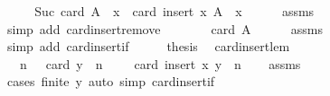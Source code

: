 \begin{isabellebody}
%
\isatagproof
{}\isamarkupfalse%
\ {\isacharminus}{\kern0pt}\isanewline
\ \ \isamarkupfalse%
\ {\isachardoublequoteopen}Suc\ {\isacharparenleft}{\kern0pt}card\ {\isacharparenleft}{\kern0pt}A\ {\isacharminus}{\kern0pt}\ {\isacharbraceleft}{\kern0pt}x{\isacharbraceright}{\kern0pt}{\isacharparenright}{\kern0pt}{\isacharparenright}{\kern0pt}\ {\isacharequal}{\kern0pt}\ card\ {\isacharparenleft}{\kern0pt}insert\ x\ {\isacharparenleft}{\kern0pt}A\ {\isacharminus}{\kern0pt}\ {\isacharbraceleft}{\kern0pt}x{\isacharbraceright}{\kern0pt}{\isacharparenright}{\kern0pt}{\isacharparenright}{\kern0pt}{\isachardoublequoteclose}\isanewline
\ \ \ \ \isamarkupfalse%
\ assms\ \isamarkupfalse%
\ {\isacharparenleft}{\kern0pt}simp\ add{\isacharcolon}{\kern0pt}\ card{\isachardot}{\kern0pt}insert{\isacharunderscore}{\kern0pt}remove{\isacharparenright}{\kern0pt}\isanewline
\ \ \isamarkupfalse%
\ \isamarkupfalse%
\ {\isachardoublequoteopen}{\isachardot}{\kern0pt}{\isachardot}{\kern0pt}{\isachardot}{\kern0pt}\ {\isacharequal}{\kern0pt}\ card\ A{\isachardoublequoteclose}\isanewline
\ \ \ \ \isamarkupfalse%
\ assms\ \isamarkupfalse%
\ {\isacharparenleft}{\kern0pt}simp\ add{\isacharcolon}{\kern0pt}\ card{\isacharunderscore}{\kern0pt}insert{\isacharunderscore}{\kern0pt}if{\isacharparenright}{\kern0pt}\isanewline
\ \ \isamarkupfalse%
\ \isamarkupfalse%
\ {\isacharquery}{\kern0pt}thesis\ \isacommand{{\isachardot}{\kern0pt}}\isamarkupfalse%
\isanewline
{}\isamarkupfalse%
%
\endisatagproof
{\isafoldproof}%
%
\isadelimproof
\isanewline
%
\endisadelimproof
\isanewline
{}\isamarkupfalse%
\ card{\isacharunderscore}{\kern0pt}insert{\isacharunderscore}{\kern0pt}le{\isacharunderscore}{\kern0pt}m{}{\isacharcolon}{\kern0pt}\isanewline
\ \ \ {\isachardoublequoteopen}n\ {\isachargreater}{\kern0pt}\ {}{\isachardoublequoteclose}\ {\isachardoublequoteopen}card\ y\ {\isasymle}\ n\ {\isacharminus}{\kern0pt}\ {}{\isachardoublequoteclose}\ \ \ {\isachardoublequoteopen}card\ {\isacharparenleft}{\kern0pt}insert\ x\ y{\isacharparenright}{\kern0pt}\ {\isasymle}\ n{\isachardoublequoteclose}\isanewline
%
\isadelimproof
\ \ %
\endisadelimproof
%
\isatagproof
{}\isamarkupfalse%
\ assms\isanewline
\ \ \isamarkupfalse%
\ {\isacharparenleft}{\kern0pt}cases\ {\isachardoublequoteopen}finite\ y{\isachardoublequoteclose}{\isacharparenright}{\kern0pt}\ {\isacharparenleft}{\kern0pt}auto\ simp{\isacharcolon}{\kern0pt}\ card{\isacharunderscore}{\kern0pt}insert{\isacharunderscore}{\kern0pt}if{\isacharparenright}{\kern0pt}%

\end{isabellebody}
